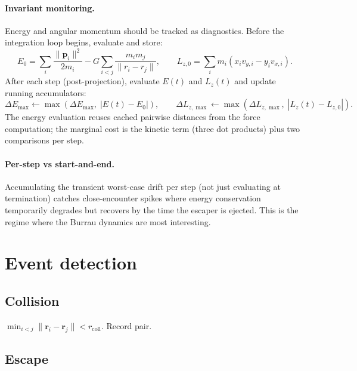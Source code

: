 \documentclass[11pt]{report}
\begin{document}
\paragraph{Invariant monitoring.} Energy and angular momentum should be tracked as diagnostics. Before the integration loop begins, evaluate and store:
\[
E_0 = \sum_i \frac{\|\mathbf p_i\|^2}{2m_i} - G\sum_{i<j}\frac{m_i m_j}{\|r_i - r_j\|}, \qquad L_{z,0} = \sum_i m_i(x_i v_{y,i} - y_i v_{x,i}).
\]
After each step (post-projection), evaluate $E(t)$ and $L_z(t)$ and update running accumulators:
\[
\Delta E_{\max} \leftarrow \max(\Delta E_{\max},\; |E(t) - E_0|), \qquad \Delta L_{z,\max} \leftarrow \max(\Delta L_{z,\max},\; |L_z(t) - L_{z,0}|).
\]
The energy evaluation reuses cached pairwise distances from the force computation; the marginal cost is the kinetic term (three dot products) plus two comparisons per step.

\paragraph{Per-step vs start-and-end.} Accumulating the transient worst-case drift per step (not just evaluating at termination) catches close-encounter spikes where energy conservation temporarily degrades but recovers by the time the escaper is ejected. This is the regime where the Burrau dynamics are most interesting.

\section{Event detection}
\label{sec:events}

\subsection{Collision}

$\min_{i<j}\|\mathbf r_i-\mathbf r_j\| < r_{\text{coll}}$. Record pair.

\subsection{Escape}
\label{sec:escape}
\end{document}

